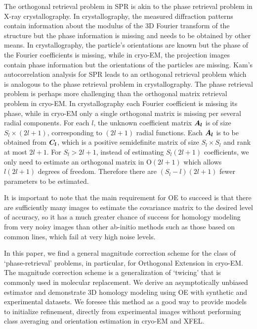 The orthogonal retrieval problem in SPR  is akin to the phase retrieval problem \cite{Burvall2011, Liu2008, Pfeiffer2006}
in X-ray crystallography. In crystallography,  
the measured diffraction patterns contain information about the modulus of the
3D
Fourier transform of the structure but the phase information is missing and
needs to be obtained by other means. In crystallography,
the particle's orientations are known but
the phase of the Fourier coefficients is missing, while in cryo-EM, the projection images contain phase information but the orientations
of the
particles are missing. Kam's autocorrelation analysis for SPR leads to an orthogonal retrieval problem which is analogous to
the phase retrieval problem in crystallography. 
The phase retrieval problem is perhaps more challenging than
the orthogonal matrix retrieval problem in cryo-EM. In crystallography
each Fourier coefficient is missing its phase, while in cryo-EM only a single
orthogonal matrix is missing per several radial components. For each $l$, the unknown coefficient matrix $\boldsymbol{A}_{\boldsymbol{l}}$ is of size $S_l \times (2l+1)$, corresponding to $(2l+1)$ radial functions. Each $\boldsymbol{A}_{\boldsymbol{l}}$ is to be obtained from $\boldsymbol{C}_{\boldsymbol{l}}$, which is a positive semidefinite matrix of size $S_l \times S_l$ and rank at most $2l+1$. For $S_l>2l+1$, instead of estimating $S_l(2l+1)$ coefficients, we only need to estimate an orthogonal matrix in $\text{O}(2l+1)$ which allows $l(2l+1)$ degrees of freedom. Therefore there are $(S_l-l)(2l+1)$ fewer parameters to be estimated.

It is important to note that the main requirement 
for OE to succeed is that there are sufficiently many images to estimate the 
covariance matrix to the desired level of accuracy, so it has a much greater 
chance of success for homology modeling from very noisy images than other 
ab-initio methods such as those based on common lines, which fail at very high noise 
levels.

In this paper, we find a general magnitude correction scheme for the class of
`phase-retrieval' problems, in particular, for Orthogonal Extension in cryo-EM.
The magnitude correction scheme is a generalization of `twicing' that is
commonly used in molecular replacement. We derive an asymptotically unbiased estimator and demonstrate 3D homology modeling using OE with synthetic and experimental datasets. We foresee this method as a good way to provide models to initialize refinement, directly from experimental images without performing class averaging and orientation estimation in cryo-EM and XFEL.


